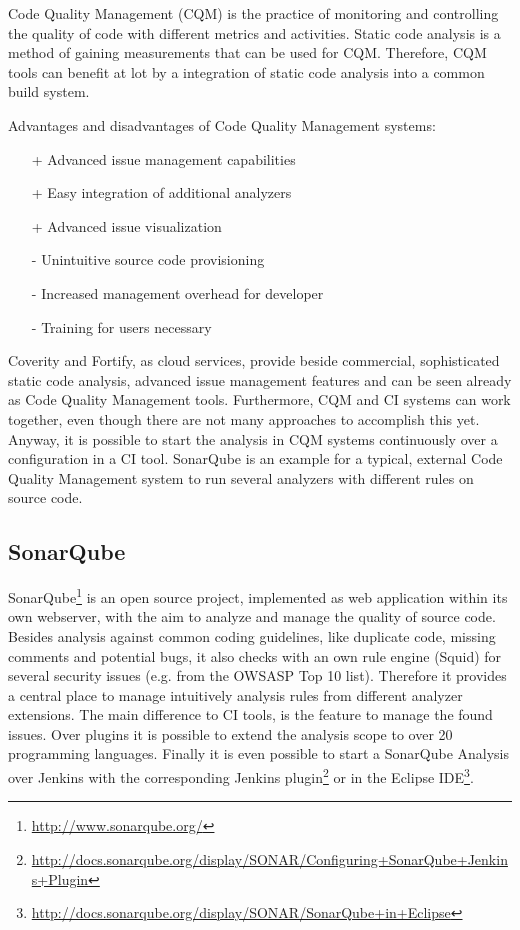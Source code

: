 \documentclass[conference]{IEEEtran}
\begin{document}
Code Quality Management (CQM) is the practice of monitoring and controlling the quality of code with different metrics and activities.
Static code analysis is a method of gaining measurements that can be used for CQM. Therefore, CQM tools can benefit at lot by a integration of static code analysis into a common build system.


Advantages and disadvantages of Code Quality Management systems:
\begin{itemize}
	\item[+] Advanced issue management capabilities
	\item[+] Easy integration of additional analyzers
	\item[+] Advanced issue visualization
	\item[-] Unintuitive source code provisioning
	\item[-] Increased management overhead for developer
	\item[-] Training for users necessary 
\end{itemize}

Coverity and Fortify, as cloud services, provide beside commercial, sophisticated static code analysis, advanced issue management features and can be seen already as Code Quality Management tools.
Furthermore, CQM and CI systems can work together, even though there are not many approaches to accomplish this yet. 
Anyway, it is possible to start the analysis in CQM systems continuously over a configuration in a CI tool.
SonarQube is an example for a typical, external Code Quality Management system to run several analyzers with different rules on source code.

\subsection{SonarQube}
\label{subsec:sonarqube}
SonarQube\footnote{\href{http://www.sonarqube.org/}{http://www.sonarqube.org/}} is an open source project, implemented as web application within its own webserver, with the aim to analyze and manage the quality of source code. 
Besides analysis against common coding guidelines, like duplicate code, missing comments and potential bugs, it also checks with an own rule engine (Squid) for several security issues (e.g. from the OWSASP Top 10 list).
Therefore it provides a central place to manage intuitively analysis rules from different analyzer extensions.
The main difference to CI tools, is the feature to manage the found issues.
Over plugins it is possible to extend the analysis scope to over 20 programming languages.
Finally it is even possible to start a SonarQube Analysis over Jenkins with the corresponding Jenkins plugin\footnote{\href{http://docs.sonarqube.org/display/SONAR/Configuring+SonarQube+Jenkins+Plugin}{http://docs.sonarqube.org/display/SONAR/Configuring+SonarQube+Jenkins+Plugin}}  or in the Eclipse IDE\footnote{\href{http://docs.sonarqube.org/display/SONAR/SonarQube+in+Eclipse}{http://docs.sonarqube.org/display/SONAR/SonarQube+in+Eclipse}}.
\end{document}
